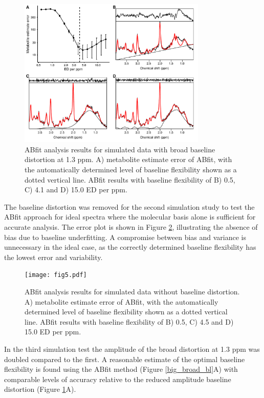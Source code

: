 \documentclass[num-refs]{wiley-article}
\begin{document}
\begin{figure}
  \begin{center}
    \includegraphics[width=0.8\textwidth]{fig4.pdf}
    \caption{ABfit analysis results for simulated data with broad baseline distortion at 1.3 ppm. A) metabolite estimate error of ABfit, with the automatically determined level of baseline flexibility shown as a dotted vertical line. ABfit results with baseline flexibility of B) 0.5, C) 4.1 and D) 15.0 ED per ppm.}
    \label{broad_bl}
  \end{center}
\end{figure}

The baseline distortion was removed for the second simulation study to test the ABfit approach for ideal spectra where the molecular basis alone is sufficient for accurate analysis. The error plot is shown in Figure \ref{flat_bl}, illustrating the absence of bias due to baseline underfitting. A compromise between bias and variance is unnecessary in the ideal case, as the correctly determined baseline flexibility has the lowest error and variability.

\begin{figure}
  \begin{center}
    \texttt{[image: fig5.pdf]}
    \caption{ABfit analysis results for simulated data without baseline distortion. A) metabolite estimate error of ABfit, with the automatically determined level of baseline flexibility shown as a dotted vertical line. ABfit results with baseline flexibility of B) 0.5, C) 4.5 and D) 15.0 ED per ppm.}
    \label{flat_bl}
  \end{center}
\end{figure}

In the third simulation test the amplitude of the broad distortion at 1.3 ppm was doubled compared to the first. A reasonable estimate of the optimal baseline flexibility is found using the ABfit method (Figure \ref{big_broad_bl}A) with comparable levels of accuracy relative to the reduced amplitude baseline distortion (Figure \ref{broad_bl}A).
\end{document}
